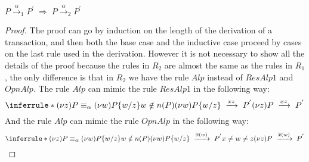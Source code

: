 \begin{theorem}
  $P\xrightarrow{\alpha}_{1}P^{'}\; \Rightarrow\; P\xrightarrow{\alpha}_{2}P^{'}$
  \begin{proof}
    The proof can go by induction on the length of the derivation of a transaction, and then both the base case and the inductive case proceed by cases on the last rule used in the derivation. However it is not necessary to show all the details of the proof because the rules in $R_{2}$ are almost the same as the rules in $R_{1}$, the only difference is that in $R_{2}$ we have the rule $Alp$ instead of $ResAlp1$ and $OpnAlp$. The rule $Alp$ can mimic the rule $ResAlp1$ in the following way:
	\[
	  \inferrule *{
	      (\nu z)P\equiv_{\alpha} (\nu w)P\{w/z\}
	    \\
	      w\notin n(P)
	    \\
	      (\nu w)P\{w/z\}\;
		\xrightarrow{xz}\;
		  P^{'}
	  }{
	    (\nu z)P\; 
	      \xrightarrow{xz}\;
		P^{'}
	  }
	\]
	And the rule $Alp$ can mimic the rule $OpnAlp$ in the following way:
	\[
	  \inferrule *{
	      (\nu z)P\equiv_{\alpha} (\nu w)P\{w/z\}
	    \\
	      w\notin n(P)
	    \\
	      (\nu w)P\{w/z\}\;
		\xrightarrow{\overline{x}(w)}\;
		  P^{'}
	    \\
	      x\neq w\neq z
	  }{
	    (\nu z)P\; 
	      \xrightarrow{\overline{x}(w)}\;
		P^{'}
	  }
	\]
  \end{proof}
\end{theorem}


